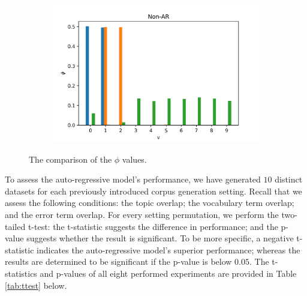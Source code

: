 \documentclass{mpaper}
\begin{document}
\begin{figure}
  \begin{subfigure}[b]{0.48\textwidth}
    \includegraphics[width=\linewidth]{phi-nonar_11.png}
  \end{subfigure}%
  \caption{The comparison of the $\phi$ values.}
  \label{fig:comp_phi}
\end{figure}
 
\par To assess the auto-regressive model's performance, we have generated $10$ distinct datasets for each previously introduced corpus generation setting. Recall that we assess the following conditions: the topic overlap; the vocabulary term overlap; and the error term overlap. For every setting permutation, we perform the two-tailed t-test: the t-statistic suggests the difference in performance; and the p-value suggests whether the result is significant. To be more specific, a negative t-statistic indicates the auto-regressive model's superior performance; whereas the results are determined to be significant if the p-value is below $0.05$. The t-statistics and p-values of all eight performed experiments are provided in Table \ref{tab:ttest} below.
\end{document}
